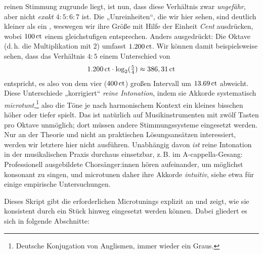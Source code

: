reinen Stimmung zugrunde liegt, ist nun, dass diese Verhältnis zwar
\emph{ungefähr}, aber nicht \emph{exakt} $4:5:6:7$ ist. Die „Unreinheiten“, die
wir hier sehen, sind deutlich kleiner als ein , weswegen wir ihre Größe
mit Hilfe der Einheit \emph{Cent} ausdrücken, wobei $100\,\mathrm{ct}$ einem
gleichstufigen  entsprechen. Anders ausgedrückt: Die Oktave (d.\,h. die
Multiplikation mit $2$) umfasst $1{.}200\,\mathrm{ct}$. Wir können damit
beispielsweise sehen, dass das Verhältnis $4:5$ einem Unterschied von
\[1{.}200\,\mathrm{ct}\cdot \log_2(\tfrac54) \approx 386,31\,\mathrm{ct}\]%
entspricht, es also von dem vier  ($400\,\mathrm{ct}$) großen Intervall um
$13.69\,\mathrm{ct}$ abweicht. Diese Unterschiede „korrigiert“ \emph{reine
  Intonation}, indem sie Akkorde systematisch
\emph{microtunt},\footnote{Deutsche Konjugation von Anglismen, immer wieder ein
  Graus.} also die Töne je nach harmonischem Kontext ein kleines bisschen höher
oder tiefer spielt. Das ist natürlich auf Musikinstrumenten mit zwölf Tasten pro
Oktave unmöglich; dort müssen andere Stimmungssysteme eingesetzt werden. Nur an
der Theorie und nicht an praktischen Lösungsansätzen interessiert, werden wir
letztere hier nicht ausführen. Unabhängig davon \emph{ist} reine Intonation in
der musikalischen Praxis durchaus einsetzbar, z.\,B. im A-cappella-Gesang:
Professionell ausgebildete Chorsänger:innen hören aufeinander, um möglichst
konsonant zu singen, und microtunen daher ihre Akkorde
\emph{intuitiv}, siehe etwa \cite{Maria} für einige empirische Untersuchungen.

Dieses Skript gibt die erforderlichen Microtunings explizit an und zeigt, wie
sie konsistent durch ein Stück hinweg eingesetzt werden können. Dabei gliedert
es sich in folgende Abschnitte:

